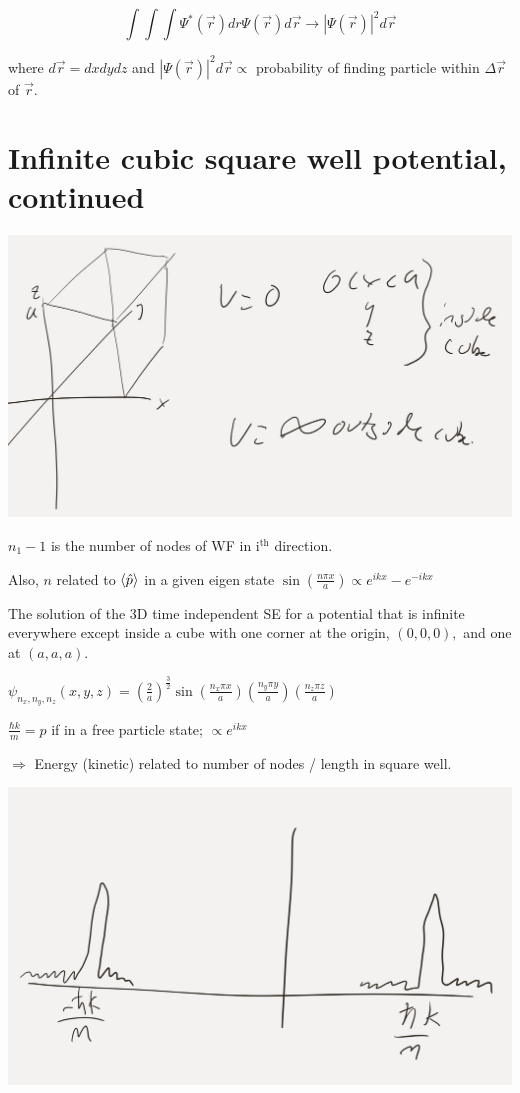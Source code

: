 \documentclass{article}
\begin{document}
$$\int \int \int \Psi^*(\vec{r}) dr \Psi(\vec{r}) d \vec{r} \rightarrow |\Psi(\vec{r})|^2 d \vec{r}$$

where $d \vec{r} = dx dy dz$ and $|\Psi(\vec{r})|^2 d \vec{r} \propto$ probability of finding particle within $\Delta \vec r$ of $\vec r$. 


\section{Infinite cubic square well potential, continued}

\includegraphics[width = 0.6 \textwidth]{Lecture18/3.png}

$n_1 - 1$ is the number of nodes of WF in $\text{i}^\text{th}$ direction. 

Also, $n$ related to $\braket{\hat{p}}$ in a given eigen state $\sin \left( \frac{n \pi x}{a} \right) \propto e^{ikx} - e^{-ikx}$

The solution of the 3D time independent SE for a potential that is infinite everywhere except inside a cube with one corner at the origin, $(0,0,0),$ and one at $(a,a,a).$

$\psi_{n_x, n_y, n_z} (x,y,z) = \left( \frac{2}{a} \right)^{\frac{3}{2}} \sin \left( \frac{n_x \pi x}{a} \right) \left( \frac{n_y \pi y}{a} \right) \left( \frac{n_z \pi z}{a} \right)$

$\frac{\hbar k}{m} = p$ if in a free particle state; $\propto e^{ikx}$

$\Rightarrow$ Energy (kinetic) related to number of nodes / length in square well. 

\includegraphics[width = 0.8 \textwidth]{Lecture19/1.png}
\end{document}
